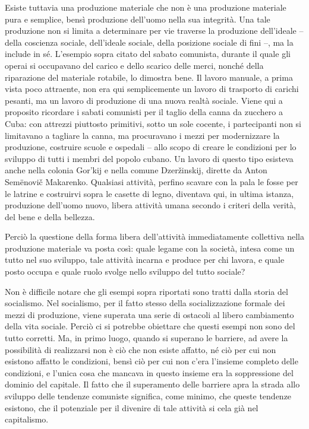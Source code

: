 \documentclass[../main]{subfiles}
\begin{document}
Esiste tuttavia una produzione materiale che non è una produzione materiale pura e semplice, bensì produzione dell'uomo nella sua integrità. Una tale produzione non si limita a determinare per vie traverse la produzione dell'ideale – della coscienza sociale, dell'ideale sociale, della posizione sociale di fini –, ma la include in sé. L'esempio sopra citato del sabato comunista, durante il quale gli operai si occupavano del carico e dello scarico delle merci, nonché della riparazione del materiale rotabile, lo dimostra bene. Il lavoro manuale, a prima vista poco attraente, non era qui semplicemente un lavoro di trasporto di carichi pesanti, ma un lavoro di produzione di una nuova realtà sociale. Viene qui a proposito ricordare i sabati comunisti per il taglio della canna da zucchero a Cuba: con attrezzi piuttosto primitivi, sotto un sole cocente, i partecipanti non si limitavano a tagliare la canna, ma procuravano i mezzi per modernizzare la produzione, costruire scuole e ospedali – allo scopo di creare le condizioni per lo sviluppo di tutti i membri del popolo cubano. Un lavoro di questo tipo esisteva anche nella colonia Gor'kij e nella comune Dzeržinskij, dirette da Anton Semënovič Makarenko. Qualsiasi attività, perfino scavare con la pala le fosse per le latrine e costruirvi sopra le casette di legno, diventava qui, in ultima istanza, produzione dell'uomo nuovo, libera attività umana secondo i criteri della verità, del bene e della bellezza.

Perciò la questione della forma libera dell'attività immediatamente collettiva nella produzione materiale va posta così: quale legame con la società, intesa come un tutto nel suo sviluppo, tale attività incarna e produce per chi lavora, e quale posto occupa e quale ruolo svolge nello sviluppo del tutto sociale?

Non è difficile notare che gli esempi sopra riportati sono tratti dalla storia del socialismo. Nel socialismo, per il fatto stesso della socializzazione formale dei mezzi di produzione, viene superata una serie di ostacoli al libero cambiamento della vita sociale. Perciò ci si potrebbe obiettare che questi esempi non sono del tutto corretti. Ma, in primo luogo, quando si superano le barriere, ad avere la possibilità di realizzarsi non è ciò che non esiste affatto, né ciò per cui non esistono affatto le condizioni, bensì ciò per cui non c'era l'insieme completo delle condizioni, e l'unica cosa che mancava in questo insieme era la soppressione del dominio del capitale. Il fatto che il superamento delle barriere apra la strada allo sviluppo delle tendenze comuniste significa, come minimo, che queste tendenze esistono, che il potenziale per il divenire di tale attività si cela già nel capitalismo.
\end{document}
